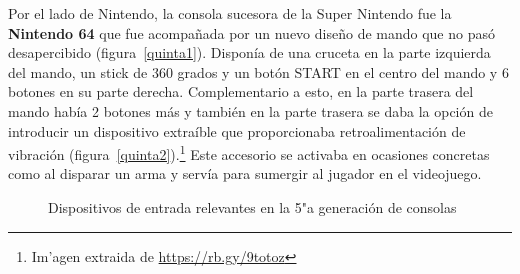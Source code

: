 Por el lado de Nintendo, la consola sucesora de la Super Nintendo fue la \textbf{Nintendo 64} que fue acompa\~nada por un nuevo dise\~no de mando que no pas\'o desapercibido (figura~\ref{quinta1}). Dispon\'ia de una cruceta en la parte izquierda del mando, un stick de 360 grados y un bot\'on START en el centro del mando y 6 botones en su parte derecha. Complementario a esto, en la parte trasera del mando hab\'ia 2 botones m\'as y tambi\'en en la parte trasera se daba la opci\'on de introducir un dispositivo extra\'ible que proporcionaba retroalimentaci\'on de vibraci\'on (figura~\ref{quinta2}).\footnote{Im'agen extraida de \url{https://rb.gy/9totoz}} Este accesorio se activaba en ocasiones concretas como al disparar un arma y serv\'ia para sumergir al jugador en el videojuego.\\

\begin{figure}[t]
\hfill
     \hfill
     \caption{Dispositivos de entrada relevantes en la 5"a  generaci\'on de consolas}
     \label{fig:quinta}
   \end{figure}

